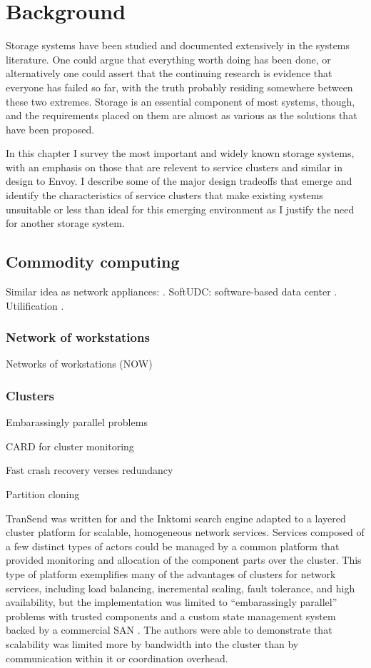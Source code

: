 \chapter{Background}

Storage systems have been studied and documented extensively in the systems literature. One could argue that everything worth doing has been done, or alternatively one could assert that the continuing research is evidence that everyone has failed so far, with the truth probably residing somewhere between these two extremes. Storage is an essential component of most systems, though, and the requirements placed on them are almost as various as the solutions that have been proposed.

In this chapter I survey the most important and widely known storage systems, with an emphasis on those that are relevent to service clusters and similar in design to Envoy. I describe some of the major design tradeoffs that emerge and identify the characteristics of service clusters that make existing systems unsuitable or less than ideal for this emerging environment as I justify the need for another storage system.

\section{Commodity computing}

Similar idea as network appliances: \cite{sapuntzakis03}. SoftUDC: software-based data center \cite{kallahalla}. Utilification \cite{wilkes04}.

\subsection{Network of workstations}
Networks of workstations (NOW)\cite{anderson95a}

\subsection{Clusters}

Embarassingly parallel problems

CARD for cluster monitoring\cite{anderson97}

Fast crash recovery verses redundancy\cite{baker94}

Partition cloning \cite{rauch}

TranSend was written for and the Inktomi search engine adapted to a layered cluster platform for scalable, homogeneous network services. Services composed of a few distinct types of actors could be managed by a common platform that provided monitoring and allocation of the component parts over the cluster. This type of platform exemplifies many of the advantages of clusters for network services, including load balancing, incremental scaling, fault tolerance, and high availability, but the implementation was limited to ``embarassingly parallel'' problems with trusted components and a custom state management system backed by a commercial SAN \cite{fox}. The authors were able to demonstrate that scalability was limited more by bandwidth into the cluster than by communication within it or coordination overhead.

